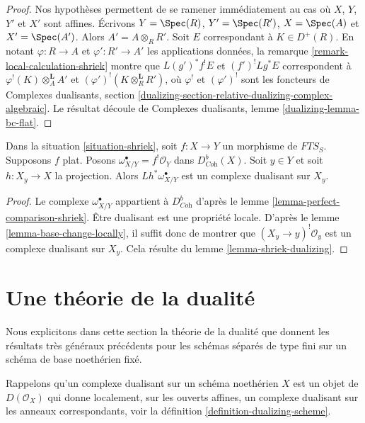 \begin{proof}
Nos hypothèses permettent de se ramener immédiatement au cas où $X$, $Y$, $Y'$ et $X'$ sont affines. Écrivons $Y = \Spec(R)$, $Y' = \Spec(R')$, $X = \Spec(A)$ et $X' = \Spec(A')$. Alors $A' = A \otimes_R R'$. Soit $E$ correspondant à $K \in D^+(R)$. En notant $\varphi : R \to A$ et $\varphi' : R' \to A'$ les applications données, la remarque \ref{remark-local-calculation-shriek} montre que $L(g')^*f^!E$ et $(f')^!Lg^*E$ correspondent à $\varphi^!(K) \otimes_A^\mathbf{L} A'$ et $(\varphi')^!(K \otimes_R^\mathbf{L} R')$, où $\varphi^!$ et $(\varphi')^!$ sont les foncteurs de Complexes dualisants, section \ref{dualizing-section-relative-dualizing-complex-algebraic}. Le résultat découle de Complexes dualisants, lemme \ref{dualizing-lemma-bc-flat}.
\end{proof}

\begin{lemma}
\label{lemma-relative-dualizing-fibres}
Dans la situation \ref{situation-shriek}, soit $f : X \to Y$ un morphisme de $\textit{FTS}_S$. Supposons $f$ plat. Posons $\omega_{X/Y}^\bullet = f^!\mathcal{O}_Y$ dans $D^b_{\textit{Coh}}(X)$. Soit $y \in Y$ et soit $h : X_y \to X$ la projection. Alors $Lh^*\omega_{X/Y}^\bullet$ est un complexe dualisant sur $X_y$.
\end{lemma}

\begin{proof}
Le complexe $\omega_{X/Y}^\bullet$ appartient à $D^b_{\textit{Coh}}$ d'après le lemme \ref{lemma-perfect-comparison-shriek}. Être dualisant est une propriété locale. D'après le lemme \ref{lemma-base-change-locally}, il suffit donc de montrer que $(X_y \to y)^!\mathcal{O}_y$ est un complexe dualisant sur $X_y$. Cela résulte du lemme \ref{lemma-shriek-dualizing}.
\end{proof}








\section{Une théorie de la dualité}
\label{section-duality}

\noindent
Nous explicitons dans cette section la théorie de la dualité que donnent les résultats très généraux précédents pour les schémas séparés de type fini sur un schéma de base noethérien fixé.

\medskip\noindent
Rappelons qu'un complexe dualisant sur un schéma noethérien $X$ est un objet de $D(\mathcal{O}_X)$ qui donne localement, sur les ouverts affines, un complexe dualisant sur les anneaux correspondants, voir la définition \ref{definition-dualizing-scheme}.

